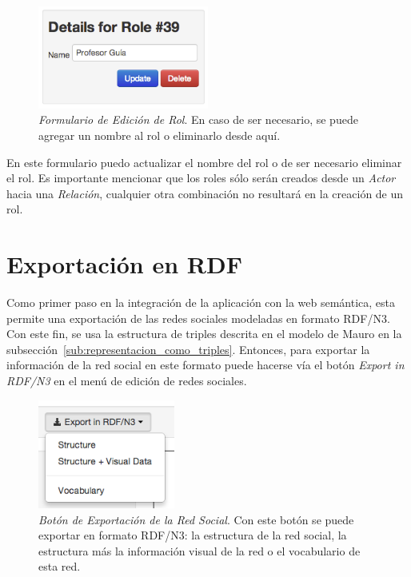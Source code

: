 \begin{figure}[H]
  \centering
  \includegraphics[width=0.5\textwidth]{images/edicion_rol.png}
  \caption[Formulario de Edición de Rol]{\emph{Formulario de Edición de Rol}. En caso de ser necesario, se puede agregar un nombre al rol o eliminarlo desde aquí.}
  \label{edicion_rol}
\end{figure}

En este formulario puedo actualizar el nombre del rol o de ser necesario eliminar el rol. Es importante mencionar que los roles sólo serán creados desde un \emph{Actor} hacia una \emph{Relación}, cualquier otra combinación no resultará en la creación de un rol.



\section{Exportación en RDF} %
\label{sec:exportacion_en_rdf}

Como primer paso en la integración de la aplicación con la web semántica, esta permite una exportación de las redes sociales modeladas en formato RDF/N3. Con este fin, se usa la estructura de triples descrita en el modelo de Mauro en la subsección~\ref{sub:representacion_como_triples}. Entonces, para exportar la información de la red social en este formato puede hacerse vía el botón \emph{Export in RDF/N3} en el menú de edición de redes sociales.\\

\begin{figure}[H]
  \centering
  \includegraphics[width=0.4\textwidth]{images/export_button.png}
  \caption[Botón de Exportación de la Red Social]{\emph{Botón de Exportación de la Red Social}. Con este botón se puede exportar en formato RDF/N3: la estructura de la red social, la estructura más la información visual de la red o el vocabulario de esta red.}
  \label{export_button}
\end{figure}

